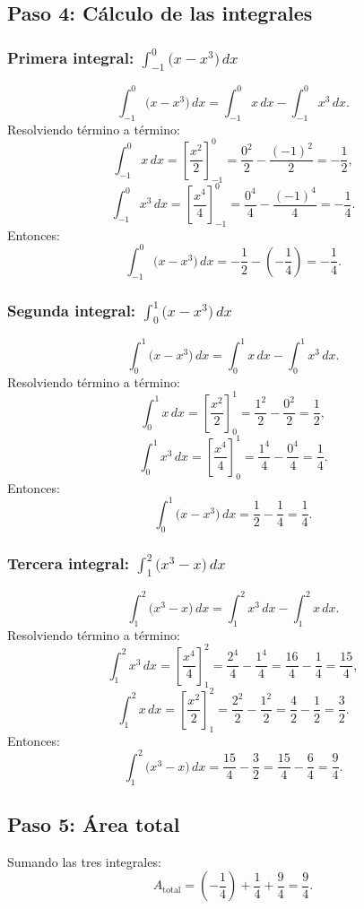 \documentclass[11pt,letterpaper]{article}
\begin{document}
\subsection*{Paso 4: Cálculo de las integrales}

\subsubsection*{Primera integral: \( \int_{-1}^0 \big(x - x^3\big) \, dx \)}
\[
\int_{-1}^0 \big(x - x^3\big) \, dx = \int_{-1}^0 x \, dx - \int_{-1}^0 x^3 \, dx.
\]
Resolviendo término a término:
\[
\int_{-1}^0 x \, dx = \left[\frac{x^2}{2}\right]_{-1}^0 = \frac{0^2}{2} - \frac{(-1)^2}{2} = -\frac{1}{2},
\]
\[
\int_{-1}^0 x^3 \, dx = \left[\frac{x^4}{4}\right]_{-1}^0 = \frac{0^4}{4} - \frac{(-1)^4}{4} = -\frac{1}{4}.
\]
Entonces:
\[
\int_{-1}^0 \big(x - x^3\big) \, dx = -\frac{1}{2} - \left(-\frac{1}{4}\right) = -\frac{1}{4}.
\]

\subsubsection*{Segunda integral: \( \int_0^1 \big(x - x^3\big) \, dx \)}
\[
\int_0^1 \big(x - x^3\big) \, dx = \int_0^1 x \, dx - \int_0^1 x^3 \, dx.
\]
Resolviendo término a término:
\[
\int_0^1 x \, dx = \left[\frac{x^2}{2}\right]_0^1 = \frac{1^2}{2} - \frac{0^2}{2} = \frac{1}{2},
\]
\[
\int_0^1 x^3 \, dx = \left[\frac{x^4}{4}\right]_0^1 = \frac{1^4}{4} - \frac{0^4}{4} = \frac{1}{4}.
\]
Entonces:
\[
\int_0^1 \big(x - x^3\big) \, dx = \frac{1}{2} - \frac{1}{4} = \frac{1}{4}.
\]

\subsubsection*{Tercera integral: \( \int_1^2 \big(x^3 - x\big) \, dx \)}
\[
\int_1^2 \big(x^3 - x\big) \, dx = \int_1^2 x^3 \, dx - \int_1^2 x \, dx.
\]
Resolviendo término a término:
\[
\int_1^2 x^3 \, dx = \left[\frac{x^4}{4}\right]_1^2 = \frac{2^4}{4} - \frac{1^4}{4} = \frac{16}{4} - \frac{1}{4} = \frac{15}{4},
\]
\[
\int_1^2 x \, dx = \left[\frac{x^2}{2}\right]_1^2 = \frac{2^2}{2} - \frac{1^2}{2} = \frac{4}{2} - \frac{1}{2} = \frac{3}{2}.
\]
Entonces:
\[
\int_1^2 \big(x^3 - x\big) \, dx = \frac{15}{4} - \frac{3}{2} = \frac{15}{4} - \frac{6}{4} = \frac{9}{4}.
\]

\subsection*{Paso 5: Área total}
Sumando las tres integrales:
\[
A_{\text{total}} = \left(-\frac{1}{4}\right) + \frac{1}{4} + \frac{9}{4} = \frac{9}{4}.
\]
\end{document}
